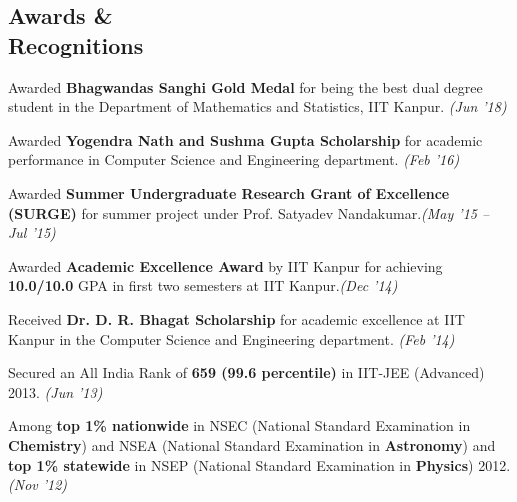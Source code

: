 \documentclass[margin,line]{resume}
\begin{document}
\begin{resume}
    \section{\mysidestyle Awards \& \\Recognitions}
    \begin{list2}
    \item Awarded \textbf{Bhagwandas Sanghi Gold Medal} for being the best dual degree student in the Department of Mathematics and Statistics, IIT Kanpur. \hfill\textit{(Jun '18)}\vspace{.05in} 
    \item Awarded \textbf{Yogendra Nath and Sushma Gupta Scholarship} for academic performance in Computer Science and Engineering department. \hspace{2.35in}\textit{(Feb '16)}\vspace{.05in}
    \newpage
    \item Awarded \textbf{Summer Undergraduate Research Grant of Excellence (SURGE)} for summer project under Prof. Satyadev Nandakumar.\hfill\textit{(May '15 -- Jul '15)}\vspace{.05in}
    \item Awarded \textbf{Academic Excellence Award} by IIT Kanpur for achieving \textbf{10.0/10.0} GPA in first two semesters at IIT Kanpur.\hfill\textit{(Dec '14)}\vspace{.05in}
    \item Received \textbf{Dr. D. R. Bhagat Scholarship} for academic excellence at IIT Kanpur in the Computer Science and Engineering department. \hfill\textit{(Feb '14)}
    \vspace{-.1in}
    \item Secured an All India Rank of \textbf{659 (99.6 percentile)} in IIT-JEE (Advanced) 2013. \hfill\textit{(Jun '13)}\vspace{.05in}
    \item Among \textbf{top 1\% nationwide} in NSEC (National Standard Examination in \textbf{Chemistry}) and NSEA (National Standard Examination in \textbf{Astronomy}) and \textbf{top 1\% statewide} in NSEP (National Standard Examination in \textbf{Physics}) 2012.  \hspace{2.27in}\textit{(Nov '12)}
    \end{list2}
    


\end{resume}
\end{document}
